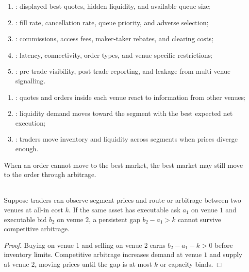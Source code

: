 \begin{taxonomy} 
\begin{enumerate}[label=\roman*.]
\setlength{\itemsep}{0pt}
\item {}: displayed best quotes, hidden liquidity, and available queue size;
\item {}: fill rate, cancellation rate, queue priority, and adverse selection;
\item {}: commissions, access fees, maker-taker rebates, and clearing costs;
\item {}: latency, connectivity, order types, and venue-specific restrictions;
\item {}: pre-trade visibility, post-trade reporting, and leakage from multi-venue signalling.
\end{enumerate}
\end{taxonomy}

\begin{mechanism} 
\begin{enumerate}[label=\roman*.]
\setlength{\itemsep}{0pt}
\item {}: quotes and orders inside each venue react to information from other venues;
\item {}: liquidity demand moves toward the segment with the best expected net execution;
\item {}: traders move inventory and liquidity across segments when prices diverge enough.
\end{enumerate}
When an order cannot move to the best market, the best market may still move to the order through arbitrage.
\end{mechanism}

\begin{proposition} \\
Suppose traders can observe segment prices and route or arbitrage between two venues at all-in cost $k$. If the same asset has executable ask $a_1$ on venue $1$ and executable bid $b_2$ on venue $2$, a persistent gap $b_2-a_1>k$ cannot survive competitive arbitrage.
\begin{proof}
Buying on venue $1$ and selling on venue $2$ earns $b_2-a_1-k>0$ before inventory limits. Competitive arbitrage increases demand at venue $1$ and supply at venue $2$, moving prices until the gap is at most $k$ or capacity binds.
\end{proof}
\end{proposition}


